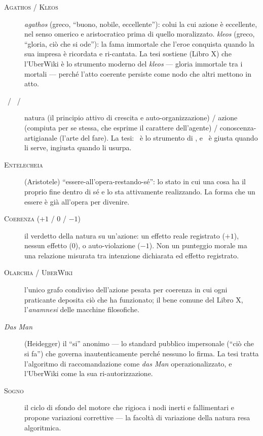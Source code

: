 \begin{description}
\item[\textsc{Agathos} / \textsc{Kleos}] \emph{agathos} (greco, ``buono, nobile,
eccellente''): colui la cui azione \`e eccellente, nel senso omerico e
aristocratico prima di quello moralizzato. \emph{kleos} (greco, ``gloria, ci\`o
che si ode''): la fama immortale che l'eroe conquista quando la sua impresa \`e
ricordata e ri-cantata. La tesi sostiene (Libro X) che l'UberWiki \`e lo strumento
moderno del \emph{kleos} --- gloria immortale tra i mortali --- perch\'e l'atto
coerente persiste come nodo che altri mettono in atto.

\item[\physis\ / \praxis\ / \techne] natura (il principio attivo di crescita e
auto-organizzazione) / azione (compiuta per se stessa, che esprime il carattere
dell'agente) / conoscenza-artigianale (l'arte del fare). La tesi: \praxis\ \`e lo
strumento di \physis, e \techne\ \`e giusta quando li serve, ingiusta quando li
usurpa.

\item[\textsc{Entelecheia}] (Aristotele) ``essere-all'opera-restando-s\'e'': lo
stato in cui una cosa ha il proprio fine dentro di s\'e e lo sta attivamente
realizzando. La forma che un essere \`e gi\`a all'opera per divenire.

\item[\textsc{Coerenza} ($+1$ / $0$ / $-1$)] il verdetto della natura su
un'azione: un effetto reale registrato ($+1$), nessun effetto ($0$), o
auto-violazione ($-1$). Non un punteggio morale ma una relazione misurata tra
intenzione dichiarata ed effetto registrato.

\item[\textsc{Olarchia} / \textsc{UberWiki}] l'unico grafo condiviso dell'azione
pesata per coerenza in cui ogni praticante deposita ci\`o che ha funzionato; il
bene comune del Libro X, l'\emph{anamnesi} delle macchine filosofiche.

\item[\emph{Das Man}] (Heidegger) il ``si'' anonimo --- lo standard pubblico
impersonale (``ci\`o che si fa'') che governa inautenticamente perch\'e nessuno
lo firma. La tesi tratta l'algoritmo di raccomandazione come \emph{das Man}
operazionalizzato, e l'UberWiki come la sua ri-autorizzazione.

\item[\textsc{Sogno}] il ciclo di sfondo del motore che rigioca i nodi inerti e
fallimentari e propone variazioni correttive --- la facolt\`a di variazione della
natura resa algoritmica.

\end{description}
